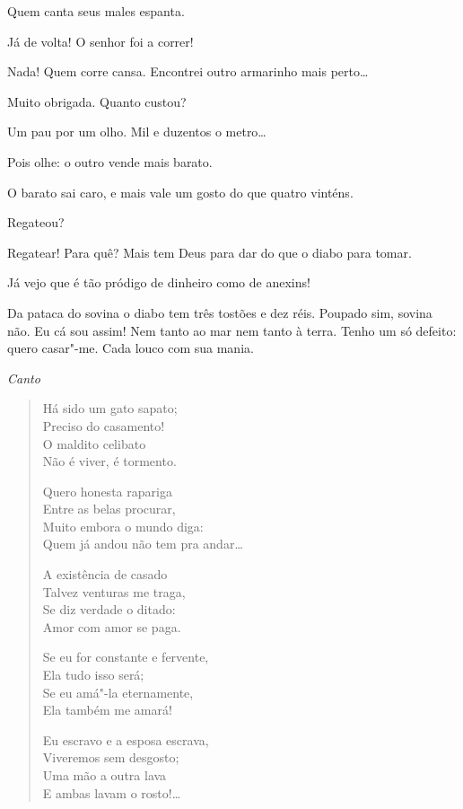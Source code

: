

   Quem canta seus males espanta.

  Já de volta! O senhor foi a correr!

  Nada! Quem corre cansa. Encontrei outro armarinho mais
perto\ldots

   Muito obrigada. Quanto custou?

  Um pau por um olho. Mil e duzentos o metro\ldots

  Pois olhe: o outro vende mais barato.

  O barato sai caro, e mais vale um gosto do que quatro vinténs.

  Regateou?

  Regatear! Para quê? Mais tem Deus para dar do que o diabo para
tomar.

  Já vejo que é tão pródigo de dinheiro como de anexins!

  Da pataca do sovina o diabo tem três tostões e dez réis. Poupado
sim, sovina não.
Eu cá sou assim! Nem tanto ao mar nem tanto à terra. Tenho um só defeito: quero
casar"-me. Cada louco com sua mania.

{\smallskip\raggedleft\itshape Canto\par}
\begin{verse} 
Há sido um gato sapato;\\
Preciso do casamento!\\
O maldito celibato\\
Não é viver, é tormento.

Quero honesta rapariga\\
Entre as belas procurar,\\
Muito embora o mundo diga:\\
Quem já andou não tem pra andar\ldots

A existência de casado\\
Talvez venturas me traga,\\
Se diz verdade o ditado:\\
Amor com amor se paga.

Se eu for constante e fervente,\\
Ela tudo isso será;\\
Se eu amá"-la eternamente,\\
Ela também me amará!

Eu escravo e a esposa escrava,\\
Viveremos sem desgosto;\\
Uma mão a outra lava\\
E ambas lavam o rosto!\ldots
\end{verse}

